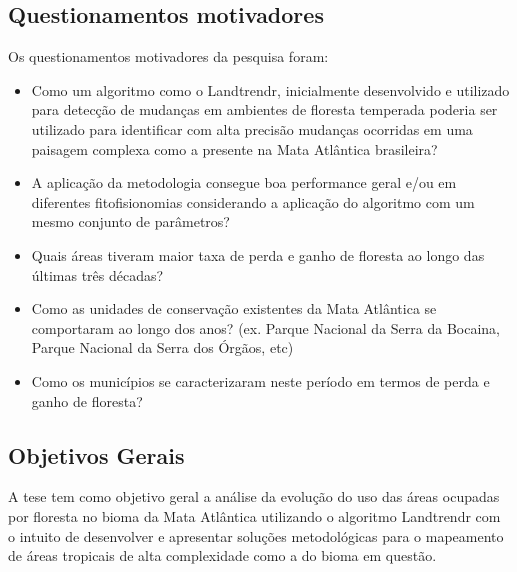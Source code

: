 \newpage

\subsection*{Questionamentos motivadores}
Os questionamentos motivadores da pesquisa foram:
\begin{itemize}
    \item Como um algoritmo como o Landtrendr, inicialmente desenvolvido e utilizado para detecção de mudanças em ambientes de floresta temperada poderia ser utilizado para identificar com alta precisão mudanças ocorridas em uma paisagem complexa como a presente na Mata Atlântica brasileira?
    
    \item A aplicação da metodologia consegue boa performance geral e/ou em diferentes fitofisionomias considerando a aplicação do algoritmo com um mesmo conjunto de parâmetros?
    
    \item Quais áreas tiveram maior taxa de perda e ganho de floresta ao longo das últimas três décadas? 
    
    \item Como as unidades de conservação existentes da Mata Atlântica se comportaram ao longo dos anos? (ex. Parque Nacional da Serra da Bocaina, Parque Nacional da Serra dos Órgãos, etc)
    
    \item Como os municípios se caracterizaram neste período em termos de perda e ganho de floresta?
\end{itemize}

\subsection*{Objetivos Gerais}
\hspace{13pt}  A tese tem como objetivo geral a análise da evolução do uso das áreas ocupadas por floresta no bioma da Mata Atlântica utilizando o algoritmo Landtrendr com o intuito de desenvolver e apresentar soluções metodológicas para o mapeamento de áreas tropicais de alta complexidade como a do bioma em questão.

